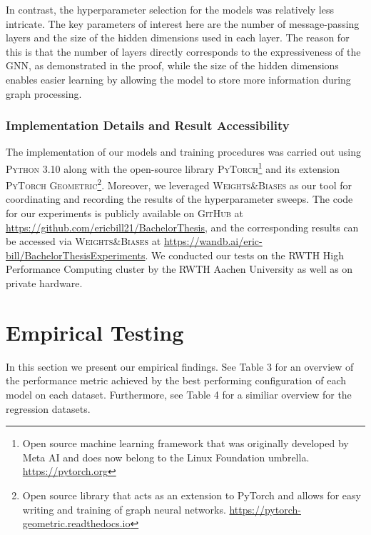 In contrast, the hyperparameter selection for the \gnn models was relatively less intricate. The key parameters of interest here are the number of message-passing layers and the size of the hidden dimensions used in each layer. The reason for this is that the number of layers directly corresponds to the expressiveness of the GNN, as demonstrated in the proof, while the size of the hidden dimensions enables easier learning by allowing the model to store more information during graph processing.

\subsubsection{Implementation Details and Result Accessibility}
The implementation of our models and training procedures was carried out using \textsc{Python 3.10} along with the open-source library \textsc{PyTorch}\footnote{Open source machine learning framework that was originally developed by Meta AI and does now belong to the Linux Foundation umbrella. \href{https://pytorch.org}{https://pytorch.org}} and its extension \textsc{PyTorch Geometric}\footnote{Open source library that acts as an extension to PyTorch and allows for easy writing and training of graph neural networks. \href{https://pytorch-geometric.readthedocs.io/en/latest}{https://pytorch-geometric.readthedocs.io}}. Moreover, we leveraged \textsc{Weights\&Biases} as our tool for coordinating and recording the results of the hyperparameter sweeps. The code for our experiments is publicly available on \textsc{GitHub} at \url{https://github.com/ericbill21/BachelorThesis}, and the corresponding results can be accessed via \textsc{Weights\&Biases} at \url{https://wandb.ai/eric-bill/BachelorThesisExperiments}. We conducted our tests on the RWTH High Performance Computing cluster by the RWTH Aachen University as well as on private hardware.

\section{Empirical Testing}
In this section we present our empirical findings. See Table 3 for an overview of the performance metric achieved by the best performing configuration of each model on each dataset. Furthermore, see Table 4 for a similiar overview for the regression datasets.

